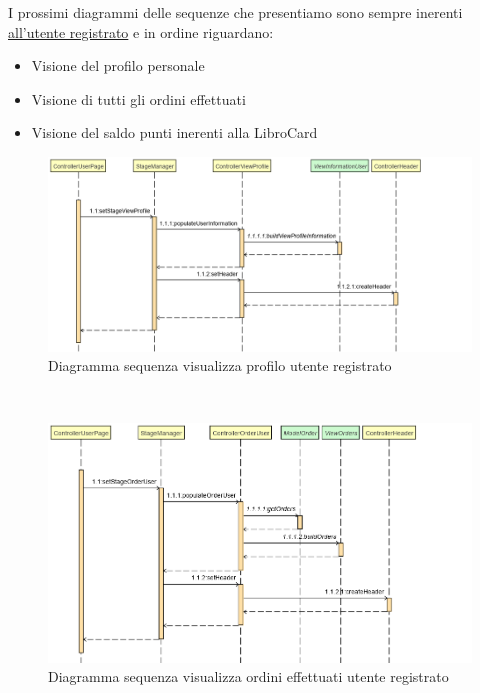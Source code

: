 \documentclass[a4paper,11pt]{report}
\begin{document}
I prossimi diagrammi delle sequenze che presentiamo sono sempre inerenti \underline{all'utente registrato} e in ordine riguardano:
\begin{itemize}
    \item Visione del profilo personale
    \item Visione di tutti gli ordini effettuati
    \item Visione del saldo punti inerenti alla LibroCard
\end{itemize}
\leavevmode \newline
\vspace{1in}
   \begin{figure}[h!]
    	\centering
    	\hspace*{-0.4in}
    	\includegraphics[width=1.3\linewidth]{Sequence diagrams/1 Registered user/UserViewProfile.png}
    	\caption{Diagramma sequenza visualizza profilo utente registrato}
    \end{figure}\leavevmode  \\
\clearpage
     \begin{figure}[h!]
    	\centering
    	\hspace*{-0.4in}
    	\includegraphics[width=1.3\linewidth]{Sequence diagrams/1 Registered user/UserMyOrders.png}
    	\caption{Diagramma sequenza visualizza ordini effettuati utente registrato}
    \end{figure} \leavevmode \\
    
\end{document}
